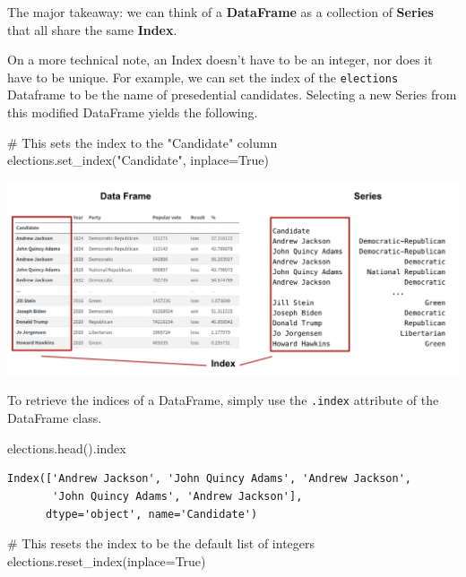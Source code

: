 \documentclass[
  letterpaper,
  DIV=11,
  numbers=noendperiod]{scrreprt}
\newenvironment{Shaded}{\begin{snugshade}}{\end{snugshade}}
\newcommand{\CommentTok}[1]{\textcolor[rgb]{0.37,0.37,0.37}{#1}}
\newcommand{\NormalTok}[1]{\textcolor[rgb]{0.00,0.23,0.31}{#1}}
\newcommand{\OperatorTok}[1]{\textcolor[rgb]{0.37,0.37,0.37}{#1}}
\newcommand{\StringTok}[1]{\textcolor[rgb]{0.13,0.47,0.30}{#1}}
\newcommand{\VariableTok}[1]{\textcolor[rgb]{0.07,0.07,0.07}{#1}}
\begin{document}
The major takeaway: we can think of a \textbf{DataFrame} as a collection
of \textbf{Series} that all share the same \textbf{Index}.

On a more technical note, an Index doesn't have to be an integer, nor
does it have to be unique. For example, we can set the index of the
\texttt{elections} Dataframe to be the name of presedential candidates.
Selecting a new Series from this modified DataFrame yields the
following.

\begin{Shaded}
\begin{Highlighting}[]
\CommentTok{\# This sets the index to the "Candidate" column}
\NormalTok{elections.set\_index(}\StringTok{"Candidate"}\NormalTok{, inplace}\OperatorTok{=}\VariableTok{True}\NormalTok{)}
\end{Highlighting}
\end{Shaded}

\includegraphics{pandas_1/images/index_comparison_2.png}

To retrieve the indices of a DataFrame, simply use the \texttt{.index}
attribute of the DataFrame class.

\begin{Shaded}
\begin{Highlighting}[]
\NormalTok{elections.head().index}
\end{Highlighting}
\end{Shaded}

\begin{verbatim}
Index(['Andrew Jackson', 'John Quincy Adams', 'Andrew Jackson',
       'John Quincy Adams', 'Andrew Jackson'],
      dtype='object', name='Candidate')
\end{verbatim}

\begin{Shaded}
\begin{Highlighting}[]
\CommentTok{\# This resets the index to be the default list of integers}
\NormalTok{elections.reset\_index(inplace}\OperatorTok{=}\VariableTok{True}\NormalTok{) }
\end{Highlighting}
\end{Shaded}
\end{document}
